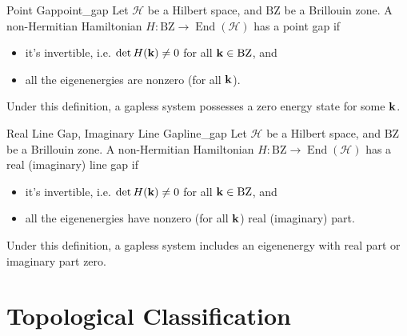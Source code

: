 \documentclass{article}
\begin{document}
\begin{definition}{Point Gap}{point_gap}
    Let $\mathcal{H}$ be a Hilbert space, and $\mathrm{BZ}$ be a Brillouin zone.
    A non-Hermitian Hamiltonian $H: \mathrm{BZ} \rightarrow \operatorname{End}(\mathcal{H})$ has a point gap if
    \begin{itemize}
        \item it's invertible, i.e. $\det H(\vb{k}) \neq 0$ for all $\vb{k}\in\mathrm{BZ}$, and
        \item all the eigenenergies are nonzero (for all $\vb{k}$).
    \end{itemize}
\end{definition}

Under this definition, a gapless system possesses a zero energy state for some $\vb{k}$.

\begin{definition}{Real Line Gap, Imaginary Line Gap}{line_gap}
    Let $\mathcal{H}$ be a Hilbert space, and $\mathrm{BZ}$ be a Brillouin zone.
    A non-Hermitian Hamiltonian $H: \mathrm{BZ} \rightarrow \operatorname{End}(\mathcal{H})$ has a real (imaginary) line gap if
    \begin{itemize}
        \item it's invertible, i.e. $\det H(\vb{k}) \neq 0$ for all $\vb{k}\in\mathrm{BZ}$, and
        \item all the eigenenergies have nonzero (for all $\vb{k}$) real (imaginary) part.
    \end{itemize}
\end{definition}

Under this definition, a gapless system includes an eigenenergy with real part or imaginary part zero.

\section{Topological Classification}
\end{document}

